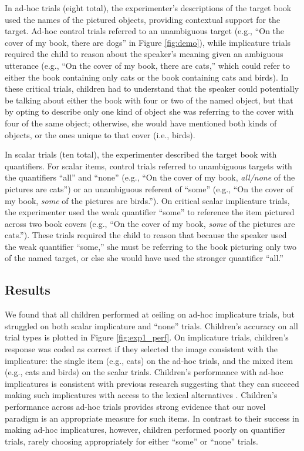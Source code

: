 \documentclass[man]{apa2}
\begin{document}
In ad-hoc trials (eight total), the experimenter's descriptions of the target book used the names of the pictured objects, providing contextual support for the target. Ad-hoc control trials referred to an unambiguous target (e.g., ``On the cover of my book, there are dogs'' in Figure \ref{fig:demo}), while implicature trials required the child to reason about the speaker's meaning given an ambiguous utterance (e.g., ``On the cover of my book, there are cats,'' which could refer to either the book containing only cats or the book containing cats and birds). In these critical trials, children had to understand that the speaker could potentially be talking about either the book with four or two of the named object, but that by opting to describe only one kind of object she was referring to the cover with four of the same object; otherwise, she would have mentioned both kinds of objects, or the ones unique to that cover (i.e., birds).

In scalar trials (ten total), the experimenter described the target book with quantifiers. For scalar items, control trials referred to unambiguous targets with the quantifiers ``all'' and ``none'' (e.g., ``On the cover of my book, \textit{all/none} of the pictures are cats'') or an unambiguous referent of ``some'' (e.g., ``On the cover of my book, \textit{some} of the pictures are birds.''). On critical scalar implicature trials, the experimenter used the weak quantifier ``some'' to reference the item pictured across two book covers (e.g., ``On the cover of my book, \textit{some} of the pictures are cats.''). These trials required the child to reason that because the speaker used the weak quantifier ``some,'' she must be referring to the book picturing only two of the named target, or else she would have used the stronger quantifier ``all.''

\subsection{Results}

We found that all children performed at ceiling on ad-hoc implicature trials, but struggled on both scalar implicature and ``none'' trials. Children's accuracy on all trial types is plotted in Figure \ref{fig:exp1_perf}. On implicature trials, children's response was coded as correct if they selected the image consistent with the implicature: the single item (e.g., cats) on the ad-hoc trials, and the mixed item (e.g., cats and birds) on the scalar trials. Children's performance with ad-hoc implicatures is consistent with previous research suggesting that they can succeed making such implicatures with access to the lexical alternatives \cite{stiller2015}. Children's performance across ad-hoc trials provides strong evidence that our novel paradigm is an appropriate measure for such items. In contrast to their success in making ad-hoc implicatures, however, children performed poorly on quantifier trials, rarely choosing appropriately for either ``some'' or ``none'' trials.
\end{document}
